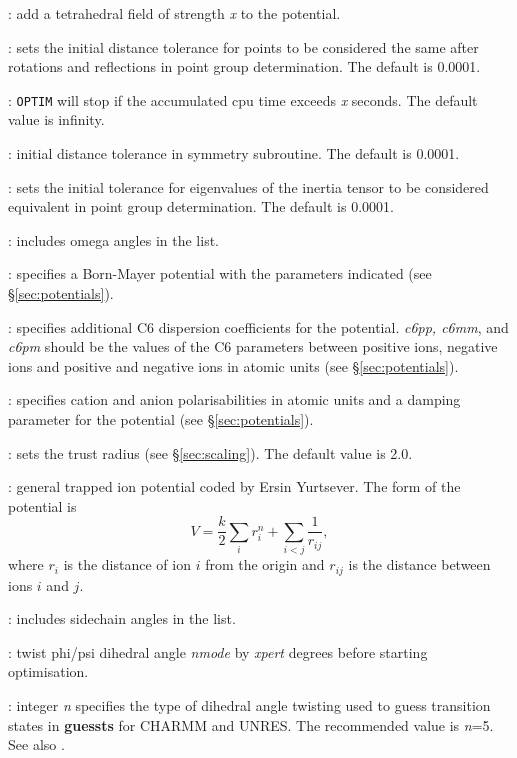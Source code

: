 {{{: add a tetrahedral field of strength {\it x} to the potential.

: sets the initial distance tolerance for points
to be considered the same after rotations and reflections in point
group determination. The default is 0.0001.

: {\tt OPTIM} will stop if the accumulated cpu
time exceeds {\it x} seconds. The default value is infinity.

: initial distance tolerance in symmetry subroutine.
The default is 0.0001.

: sets the initial tolerance for eigenvalues
of the inertia tensor to be considered equivalent in point
group determination. The default is 0.0001.

: includes omega angles in the {} list.

: specifies a Born-Mayer potential
with the parameters indicated (see \S\ref{sec:potentials}).

: specifies additional C6 dispersion coefficients
for the {\/} potential. {\it c6pp, c6mm\/}, and  {\it c6pm\/} should be the values of the C6
parameters between positive ions, negative ions and positive and negative ions in atomic units
(see \S\ref{sec:potentials}).

: specifies cation and anion polarisabilities in atomic units
and a damping parameter for the {\/} potential (see \S\ref{sec:potentials}).

: sets the trust radius (see \S\ref{sec:scaling}). The default value is 2.0.

: general trapped ion potential coded by Ersin Yurtsever. 
The form of the potential is 
\begin{displaymath}
V=\frac{k}{2}\sum_i r_i^n + \sum_{i<j} \frac{1}{r_{ij}},
\end{displaymath}
where $r_i$ is the distance of ion $i$ from the origin and
$r_{ij}$ is the distance between ions $i$ and $j$.

: includes sidechain angles in the {} list.

: twist phi/psi dihedral angle {\it nmode\/} by 
{\it xpert\/} degrees before starting optimisation.

: integer {\it n\/} specifies the type of dihedral angle twisting
used to  guess transition states in {\bf guessts} for CHARMM and UNRES.
The recommended value is {\it n}=5. See also {}.

}}}

